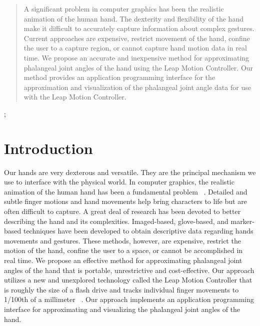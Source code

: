 \documentclass[review]{acmsiggraph}
\begin{document}
\maketitle

\begin{abstract}

A significant problem in computer graphics has been the
realistic animation of the human hand. The dexterity and
flexibility of the hand make it difficult to accurately capture
information about complex gestures. Current approaches
are expensive, restrict movement of the hand, confine the
user to a capture region, or cannot capture hand motion
data in real time.
We propose an accurate and inexpensive method for approximating
phalangeal joint angles of the hand using the
Leap Motion Controller. Our method provides an application
programming interface for the approximation and
visualization of the phalangeal joint angle data for use with
the Leap Motion Controller.

\end{abstract}

\begin{CRcatlist}
  ;
\end{CRcatlist}

\keywordlist

\TOGlinkslist

\copyrightspace

\section{Introduction}

Our hands are very dexterous and versatile. They are the
principal mechanism we use to interface with the physical
world. In computer graphics, the realistic animation of the
human hand has been a fundamental problem ~\cite{ZCX12}.
Detailed and subtle finger motions and hand movements
help bring characters to life but are often difficult to capture.
A great deal of research has been devoted to better
describing the hand and its complexities. Imaged-based,
glove-based, and marker-based techniques have been developed
to obtain descriptive data regarding hands movements
and gestures. These methods, however, are expensive,
restrict the motion of the hand, confine the user to a
space, or cannot be accomplished in real time.
We propose an effective method for approximating phalangeal
joint angles of the hand that is portable, unrestrictive
and cost-effective. Our approach utilizes a new and
unexplored technology called the Leap Motion Controller
that is roughly the size of a flash drive and tracks individual
finger movements to 1/100th of a millimeter ~\cite{LEA}. Our
approach implements an application programming interface
for approximating and visualizing the phalangeal joint
angles of the hand.
\end{document}
